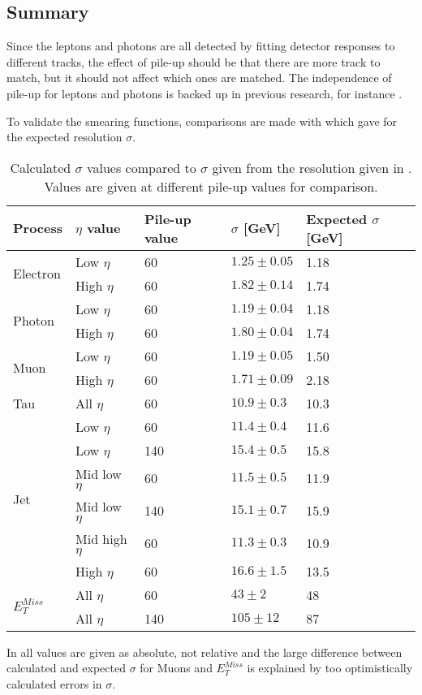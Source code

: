 \subsection{Summary}\label{sec:res:subsec:sum}
Since the leptons and photons are all detected by fitting detector responses to different tracks, the effect of pile-up should be that there are more track to match, but it should not affect which ones are matched. The independence of pile-up for leptons and photons is backed up in previous research, for instance \citep{Electronperf:2011, ATLAS:LOI2}.

To validate the smearing functions, comparisons are made with \citep{ATL-PHYS-PUB-2013-004} which gave  for the expected resolution $\sigma$.
\renewcommand{\arraystretch}{1.2} %
\begin{table}[H]
\begin{center}
\begin{tabular}{|l|l|l|l|l|}
\hline
Process& $\eta$ value & Pile-up value &$\sigma$ [GeV]& Expected $\sigma$ [GeV]\\ \hline
\multirow{2}{*}{Electron}& Low $\eta$&60&$1.25 \pm 0.05$&1.18\\
&High $\eta$&60&$1.82 \pm 0.14$&1.74\\ \hline
\multirow{2}{*}{Photon} & Low $\eta$&60&$1.19 \pm 0.04$&1.18\\
&High $\eta$&60&$1.80 \pm 0.04$&1.74\\ \hline
\multirow{2}{*}{Muon} & Low $\eta$&60&$1.19 \pm 0.05$&1.50\\
&High $\eta$&60&$1.71 \pm 0.09$&2.18\\ \hline
Tau& All $\eta$&60&$10.9 \pm 0.3$&10.3\\ \hline
\multirow{6}{*}{Jet} &Low $\eta$&60&$11.4 \pm 0.4$&11.6\\
&Low $\eta$&140&$15.4 \pm 0.5$&15.8\\
&Mid low $\eta$&60&$11.5 \pm 0.5$&11.9\\
&Mid low $\eta$&140&$15.1 \pm 0.7$&15.9\\
&Mid high $\eta$&60&$11.3 \pm 0.3$&10.9\\
&High $\eta$&60&$16.6 \pm 1.5$&13.5\\ \hline
\multirow{2}{*}{$E_T^{Miss}$}&All $\eta$&60&$43 \pm 2$&48\\ 
&All $\eta$&140&$105 \pm 12$&87\\  \hline
\end{tabular}
\end{center}
\caption{Calculated $\sigma$ values compared to $\sigma$ given from the resolution given in . Values are given at different pile-up values for comparison.}
\label{tab:sigmaval}
\end{table}
\renewcommand{\arraystretch}{1.0} %
In  all values are given as absolute, not relative and the large difference between calculated and expected $\sigma$ for Muons and $E_T^{Miss}$ is explained by too optimistically calculated errors in $\sigma$.

